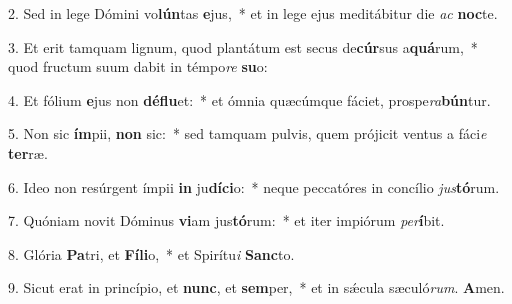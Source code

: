 2. Sed in lege Dómini vo\textbf{lún}tas \textbf{e}jus,~*  et in lege ejus meditábitur die \textit{ac} \textbf{noc}te.\

3. Et erit tamquam lignum, quod plantátum est secus de\textbf{cúr}sus a\textbf{quá}rum,~*  quod fructum suum dabit in témpo\textit{re} \textbf{su}o:\

4. Et fólium \textbf{e}jus non \textbf{dé}\textbf{flu}et:~*  et ómnia quæcúmque fáciet, prospe\textit{ra}\textbf{bún}tur.\

5. Non sic \textbf{ím}pii, \textbf{non} sic:~*  sed tamquam pulvis, quem prójicit ventus a fáci\textit{e} \textbf{ter}ræ.\

6. Ideo non resúrgent ímpii \textbf{in} ju\textbf{dí}\textbf{ci}o:~*  neque peccatóres in concílio \textit{jus}\textbf{tó}rum.\

7. Quóniam novit Dóminus \textbf{vi}am jus\textbf{tó}rum:~*  et iter impiórum \textit{per}\textbf{í}bit.\

8. Glória \textbf{Pa}tri, et \textbf{Fí}\textbf{li}o,~*  et Spirítu\textit{i} \textbf{Sanc}to.\

9. Sicut erat in princípio, et \textbf{nunc}, et \textbf{sem}per,~*  et in sǽcula sæculó\textit{rum}. \textbf{A}men.\

